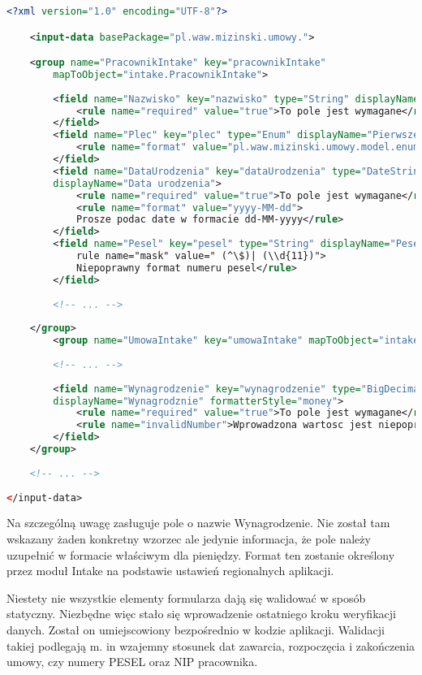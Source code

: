 \begin{lstlisting}[language=XML,style=outcode,showstringspaces=false,caption=Konfiguracja modułu Intake,label={intakeGroupFactory}]
<?xml version="1.0" encoding="UTF-8"?>

	<input-data basePackage="pl.waw.mizinski.umowy.">

	<group name="PracownikIntake" key="pracownikIntake" 
		mapToObject="intake.PracownikIntake">
		
		<field name="Nazwisko" key="nazwisko" type="String" displayName="Nazwisko">
			<rule name="required" value="true">To pole jest wymagane</rule>
		</field>
		<field name="Plec" key="plec" type="Enum" displayName="Pierwsze imie">
			<rule name="format" value="pl.waw.mizinski.umowy.model.enums.Plec"/>
		</field>
		<field name="DataUrodzenia" key="dataUrodzenia" type="DateString" 
		displayName="Data urodzenia">
			<rule name="required" value="true">To pole jest wymagane</rule>
			<rule name="format" value="yyyy-MM-dd">
			Prosze podac date w formacie dd-MM-yyyy</rule>
		</field>
		<field name="Pesel" key="pesel" type="String" displayName="Pesel">
			rule name="mask" value=" (^\$)| (\\d{11})">
			Niepoprawny format numeru pesel</rule>
		</field>
		
		<!-- ... -->
		
	</group>
		<group name="UmowaIntake" key="umowaIntake" mapToObject="intake.UmowaIntake">
		
		<!-- ... -->
		
		<field name="Wynagrodzenie" key="wynagrodzenie" type="BigDecimal" 
		displayName="Wynagrodznie" formatterStyle="money">
			<rule name="required" value="true">To pole jest wymagane</rule>
			<rule name="invalidNumber">Wprowadzona wartosc jest niepoprawna</rule>
		</field>
	</group>
	
	<!-- ... -->
	
</input-data>
\end{lstlisting}

Na szczególną uwagę zasługuje pole o nazwie Wynagrodzenie. Nie został tam wskazany żaden konkretny wzorzec ale jedynie informacja, że pole należy uzupełnić w formacie właściwym dla pieniędzy. Format ten zostanie określony przez moduł Intake na podstawie ustawień regionalnych aplikacji. 

Niestety nie wszystkie elementy formularza dają się walidować w sposób statyczny. Niezbędne więc stało się wprowadzenie ostatniego kroku weryfikacji danych. Został on umiejscowiony bezpośrednio w kodzie aplikacji. Walidacji takiej podlegają m. in wzajemny stosunek dat zawarcia, rozpoczęcia i zakończenia umowy, czy numery PESEL oraz NIP pracownika.

